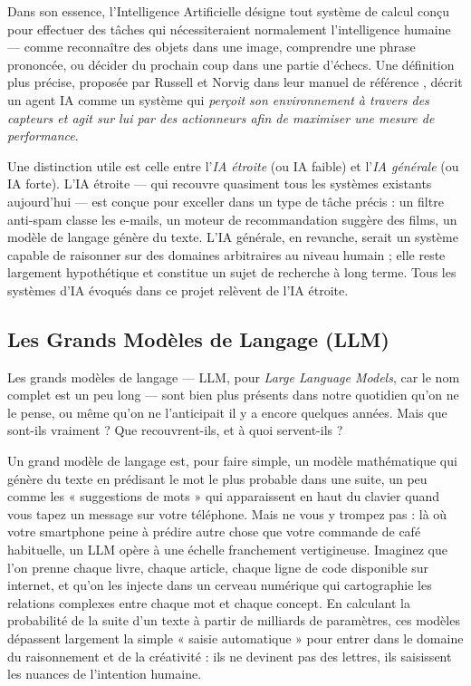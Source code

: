\documentclass[a4paper,11pt]{article}
\begin{document}
Dans son essence, l'Intelligence Artificielle désigne tout système de calcul
conçu pour effectuer des tâches qui nécessiteraient normalement l'intelligence
humaine --- comme reconnaître des objets dans une image, comprendre une phrase
prononcée, ou décider du prochain coup dans une partie d'échecs. Une définition
plus précise, proposée par Russell et Norvig dans leur manuel de référence
\cite{russell2010ai}, décrit un agent IA comme un système qui \emph{perçoit
son environnement à travers des capteurs et agit sur lui par des actionneurs
afin de maximiser une mesure de performance}.

Une distinction utile est celle entre l'\emph{IA étroite} (ou IA faible) et
l'\emph{IA générale} (ou IA forte). L'IA étroite --- qui recouvre quasiment
tous les systèmes existants aujourd'hui --- est conçue pour exceller dans un
type de tâche précis : un filtre anti-spam classe les e-mails, un moteur de
recommandation suggère des films, un modèle de langage génère du texte.
L'IA générale, en revanche, serait un système capable de raisonner sur des
domaines arbitraires au niveau humain ; elle reste largement hypothétique et
constitue un sujet de recherche à long terme. Tous les systèmes d'IA évoqués
dans ce projet relèvent de l'IA étroite.

\newpage
\subsection{Les Grands Modèles de Langage (LLM)}

Les grands modèles de langage --- LLM, pour \emph{Large Language Models}, car
le nom complet est un peu long --- sont bien plus présents dans notre quotidien
qu'on ne le pense, ou même qu'on ne l'anticipait il y a encore quelques années.
Mais que sont-ils vraiment ? Que recouvrent-ils, et à quoi servent-ils ?

Un grand modèle de langage est, pour faire simple, un modèle mathématique qui
génère du texte en prédisant le mot le plus probable dans une suite, un peu
comme les « suggestions de mots » qui apparaissent en haut du clavier quand
vous tapez un message sur votre téléphone. Mais ne vous y trompez pas : là où
votre smartphone peine à prédire autre chose que votre commande de café
habituelle, un LLM opère à une échelle franchement vertigineuse. Imaginez que
l'on prenne chaque livre, chaque article, chaque ligne de code disponible sur
internet, et qu'on les injecte dans un cerveau numérique qui cartographie les
relations complexes entre chaque mot et chaque concept. En calculant la
probabilité de la suite d'un texte à partir de milliards de paramètres, ces
modèles dépassent largement la simple « saisie automatique » pour entrer dans
le domaine du raisonnement et de la créativité : ils ne devinent pas des
lettres, ils saisissent les nuances de l'intention humaine.
\end{document}
